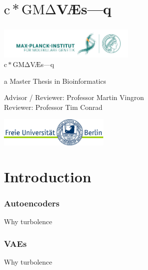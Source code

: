\documentclass[final]{beamer}
\title{\scgmvae}{}
\author{Kolb, Yiftach}
\newcommand{\scgmvae}{$\mathrm{c}{\ast}\mathrm{GM\Delta}$V{\AE}s---q}
\begin{document}
\maketitle

\section{\scgmvae}

\begin{frame}
\frametitle{}
\begin{center}
{\includegraphics[width=0.5\textwidth]{images/MPIMG_RGB_gruen.png}}\\
\vspace*{1cm}
\large
\scgmvae

\normalsize
a Master Thesis in Bioinformatics
\vspace{0.2cm}

Advisor / Reviewer: Professor Martin Vingron\\
Reviewer: Professor Tim Conrad

\vfill



\vfill
{\includegraphics[width=0.4\textwidth]{images/fu-logo_bildschirm_RGB1.jpg}}
\end{center}
\normalsize
\end{frame}

\section{Introduction}

\begin{frame}
\frametitle{Autoencoders}
Why turbolence
\end{frame}

\begin{frame}
\frametitle{VAEs}
Why turbolence
\end{frame}
\end{document}

